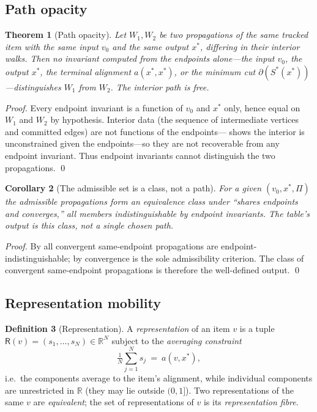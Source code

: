 \documentclass[11pt,a4paper]{article}
\theoremstyle{thmstyle}
\newtheorem{theorem}{Theorem}[section]
\newtheorem{corollary}[theorem]{Corollary}
\theoremstyle{definition}
\newtheorem{definition}[theorem]{Definition}
\theoremstyle{remark}
\newcommand{\R}{\mathbb{R}}
\newcommand{\cut}{\partial}              %
\newcommand{\Rep}{\mathsf{R}}            %
\newcommand{\Proc}{\Pi}                  %
\begin{document}
\subsection{Path opacity}

\begin{theorem}[Path opacity]
\label{thm:path-opacity}
Let $W_1,W_2$ be two propagations of the same tracked item with the same
input $v_0$ and the same output $x^{\ast}$, differing in their interior
walks. Then no invariant computed from the endpoints alone---the input
$v_0$, the output $x^{\ast}$, the terminal alignment $a(x^{\ast},x^{\ast})$,
or the minimum cut $\cut(S^{\ast}(x^{\ast}))$---distinguishes $W_1$ from
$W_2$. The interior path is free.
\end{theorem}

\begin{proof}
Every endpoint invariant is a function of $v_0$ and $x^{\ast}$ only, hence
equal on $W_1$ and $W_2$ by hypothesis. Interior data (the sequence of
intermediate vertices and committed edges) are not functions of the
endpoints--- shows the interior is unconstrained
given the endpoints---so they are not recoverable from any endpoint
invariant. Thus endpoint invariants cannot distinguish the two
propagations. \qed
\end{proof}

\begin{corollary}[The admissible set is a class, not a path]
\label{cor:gauge}
For a given $(v_0,x^{\ast},\Proc)$ the admissible propagations form an
equivalence class under ``shares endpoints and converges,'' all members
indistinguishable by endpoint invariants. The table's output is this
class, not a single chosen path.
\end{corollary}

\begin{proof}
By  all convergent same-endpoint propagations are
endpoint-indistinguishable; by  convergence is the
sole admissibility criterion. The class of convergent same-endpoint
propagations is therefore the well-defined output. \qed
\end{proof}

\subsection{Representation mobility}

\begin{definition}[Representation]
\label{def:representation}
A \emph{representation} of an item $v$ is a tuple
$\Rep(v)=(s_1,\dots,s_N)\in\R^N$ subject to the \emph{averaging
constraint}
\[
\tfrac1N\textstyle\sum_{j=1}^{N}s_j\ =\ a(v,x^{\ast}),
\]
i.e.\ the components average to the item's alignment, while individual
components are unrestricted in $\R$ (they may lie outside $(0,1]$). Two
representations of the same $v$ are \emph{equivalent}; the set of
representations of $v$ is its \emph{representation fibre}.
\end{definition}
\end{document}
